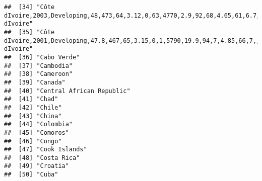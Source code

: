 \documentclass[
]{article}
\begin{document}
\begin{verbatim}
##  [34] "Côte dIvoire,2003,Developing,48,473,64,3.12,0,63,4770,2.9,92,68,4.65,61,6.7,,,7.5,7.5,,\nCôte dIvoire"                                                
##  [35] "Côte dIvoire,2001,Developing,47.8,467,65,3.15,0,1,5790,19.9,94,7,4.85,66,7,,,7.9,7.9,,\nCôte dIvoire"                                                 
##  [36] "Cabo Verde"                                                                                                                                           
##  [37] "Cambodia"                                                                                                                                             
##  [38] "Cameroon"                                                                                                                                             
##  [39] "Canada"                                                                                                                                               
##  [40] "Central African Republic"                                                                                                                             
##  [41] "Chad"                                                                                                                                                 
##  [42] "Chile"                                                                                                                                                
##  [43] "China"                                                                                                                                                
##  [44] "Colombia"                                                                                                                                             
##  [45] "Comoros"                                                                                                                                              
##  [46] "Congo"                                                                                                                                                
##  [47] "Cook Islands"                                                                                                                                         
##  [48] "Costa Rica"                                                                                                                                           
##  [49] "Croatia"                                                                                                                                              
##  [50] "Cuba"                                                                                                                                                 

\end{verbatim}
\end{document}
